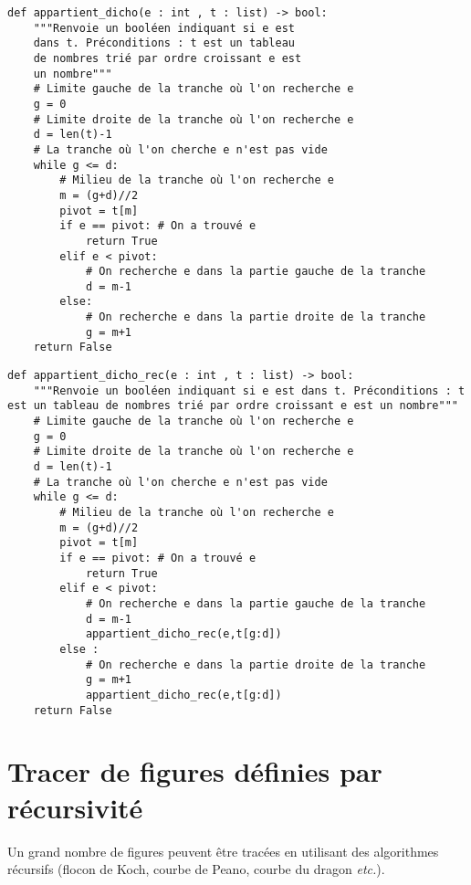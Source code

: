 \begin{lstlisting}
def appartient_dicho(e : int , t : list) -> bool:
    """Renvoie un booléen indiquant si e est 
    dans t. Préconditions : t est un tableau 
    de nombres trié par ordre croissant e est 
    un nombre"""
    # Limite gauche de la tranche où l'on recherche e
    g = 0 
    # Limite droite de la tranche où l'on recherche e
    d = len(t)-1 
    # La tranche où l'on cherche e n'est pas vide
    while g <= d: 
        # Milieu de la tranche où l'on recherche e
        m = (g+d)//2 
        pivot = t[m]
        if e == pivot: # On a trouvé e
            return True
        elif e < pivot:
            # On recherche e dans la partie gauche de la tranche
            d = m-1 
        else:
            # On recherche e dans la partie droite de la tranche
            g = m+1 
    return False
\end{lstlisting}

\begin{lstlisting}
def appartient_dicho_rec(e : int , t : list) -> bool:
    """Renvoie un booléen indiquant si e est dans t. Préconditions : t est un tableau de nombres trié par ordre croissant e est un nombre"""
    # Limite gauche de la tranche où l'on recherche e
    g = 0 
    # Limite droite de la tranche où l'on recherche e
    d = len(t)-1 
    # La tranche où l'on cherche e n'est pas vide
    while g <= d:
        # Milieu de la tranche où l'on recherche e 
        m = (g+d)//2 
        pivot = t[m]
        if e == pivot: # On a trouvé e
            return True
        elif e < pivot:
            # On recherche e dans la partie gauche de la tranche
            d = m-1 
            appartient_dicho_rec(e,t[g:d])
        else :
            # On recherche e dans la partie droite de la tranche
            g = m+1
            appartient_dicho_rec(e,t[g:d])
    return False
\end{lstlisting}

\section{Tracer de figures définies par récursivité}
Un grand nombre de figures peuvent être tracées en utilisant des algorithmes récursifs (flocon de Koch, courbe de Peano, courbe du dragon \textit{etc.}).

